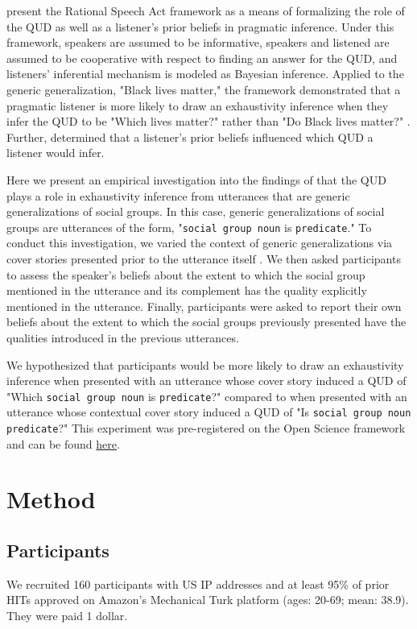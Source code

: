 \documentclass[11pt,a4paper]{article}
\begin{document}
\citet{Frank998} present the Rational Speech Act framework as a means of formalizing the role of the QUD as well as a listener's prior beliefs in pragmatic inference. Under this framework, speakers are assumed to be informative, speakers and listened are assumed to be cooperative with respect to finding an answer for the QUD, and listeners' inferential mechanism is modeled as Bayesian inference. Applied to the generic generalization, "Black lives matter," the framework demonstrated that a pragmatic listener is more likely to draw an exhaustivity inference when they infer the QUD to be "Which lives matter?" rather than "Do Black lives matter?" \cite{degen2017}. Further, \citet{degen2017} determined that a listener's prior beliefs influenced which QUD a listener would infer.

Here we present an empirical investigation into the findings of \citet{degen2017} that the QUD plays a role in exhaustivity inference from utterances that are generic generalizations of social groups. In this case, generic generalizations of social groups are utterances of the form, "\texttt{social group noun} is \texttt{predicate}." To conduct this investigation, we varied the context of generic generalizations via cover stories presented prior to the utterance itself \cite{degen-goodman-2014}. We then asked participants to assess the speaker's beliefs about the extent to which the social group mentioned in the utterance and its complement has the quality explicitly mentioned in the utterance. Finally, participants were asked to report their own beliefs about the extent to which the social groups previously presented have the qualities introduced in the previous utterances. 

We hypothesized that participants would be more likely to draw an exhaustivity inference when presented with an utterance whose cover story induced a QUD of "Which \texttt{social group noun} is \texttt{predicate}?" compared to when presented with an utterance whose contextual cover story induced a QUD of "Is \texttt{social group noun} \texttt{predicate}?" This experiment was pre-registered on the Open Science framework and can be found \href{https://osf.io/hqy94/register/5771ca429ad5a1020de2872e}{here}. 

\section{Method}
\subsection{Participants}
We recruited 160 participants with US IP addresses and at least 95\% of prior HITs approved on Amazon's Mechanical Turk platform (ages: 20-69; mean: 38.9). They were paid 1 dollar.
\end{document}
